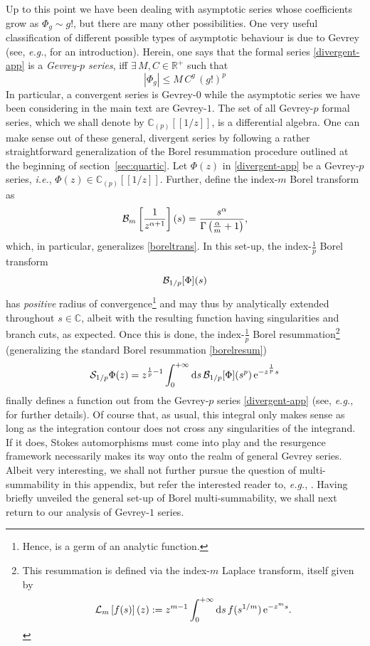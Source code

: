 \documentclass[11pt,a4paper]{article}
\newcommand{\CB}{{\cal B}}
\newcommand{\CL}{{\cal L}}
\newcommand{\CS}{{\cal S}}
\def\BR{{\mathbb R}}
\def\BC{{\mathbb C}}
\newcommand{\be}{\begin{equation}}
\newcommand{\ee}{\end{equation}}
\newcommand{\rme}{{\mathrm{e}}}
\newcommand{\rmd}{{\mathrm{d}}}
\begin{document}
Up to this point we have been dealing with asymptotic series whose coefficients grow as $\Phi_g \sim g!$, but there are many other possibilities. One very useful classification of different possible types of asymptotic behaviour is due to Gevrey (see, \textit{e.g.}, \cite{j14} for an introduction). Herein, one says that the formal series \eqref{divergent-app} is a \textit{Gevrey-$p$ series}, iff $\exists\, M,C \in \BR^+$ such that
%
\be
| \Phi_g | \le M\, C^g\, \left( g! \right)^p
\ee
%
\noindent
In particular, a convergent series is Gevrey-$0$ while the asymptotic series we have been considering in the main text are Gevrey-$1$. The set of all Gevrey-$p$ formal series, which we shall denote by $\BC_{(p)} [[1/z]]$, is a differential algebra. One can make sense out of these general, divergent series by following a rather straightforward generalization of the Borel resummation procedure outlined at the beginning of section~\ref{sec:quartic}. Let $\Phi (z)$ in \eqref{divergent-app} be a Gevrey-$p$ series, \textit{i.e.}, $\Phi (z) \in \BC_{(p)} [[1/z]]$. Further, define the index-$m$ Borel transform as
%
\be
\CB_m \left[ \frac{1}{z^{\alpha+1}} \right](s) = \frac{s^{\alpha}}{\Gamma \left( \frac{\alpha}{m}+1 \right)},
\ee
%
\noindent
which, in particular, generalizes \eqref{boreltrans}. In this set-up, the index-$\frac{1}{p}$ Borel transform
%
\be
\CB_{1/p} [ \Phi ](s)
\ee
%
\noindent
has \textit{positive} radius of convergence\footnote{Hence, is a germ of an analytic function.} and may thus by analytically extended throughout $s \in \BC$, albeit with the resulting function having singularities and branch cuts, as expected. Once this is done, the index-$\frac{1}{p}$ Borel resummation\footnote{This resummation is defined via the index-$m$ Laplace transform, itself given by
%
\be
\CL_m \left[ f(s) \right] (z) := z^{m-1} \int_0^{+\infty} \rmd s\, f ( s^{1/m} )\, \rme^{- z^m s}.
\ee} (generalizing the standard Borel resummation \eqref{borelresum})
%
\be
\label{borel-resum-app}
\CS_{1/p} \Phi (z) = z^{\frac{1}{p}-1} \int_0^{+\infty} \rmd s\, \CB_{1/p} [\Phi](s^{p})\, \rme^{- z^{\frac{1}{p}} s}
\ee
%
\noindent
finally defines a function out from the Gevrey-$p$ series \eqref{divergent-app} (see, \textit{e.g.}, \cite{j14} for further details). Of course that, as usual, this integral only makes sense as long as the integration contour does not cross any singularities of the integrand. If it does, Stokes automorphisms must come into play and the resurgence framework necessarily makes its way onto the realm of general Gevrey series. Albeit very interesting, we shall not further pursue the question of multi-summability in this appendix, but refer the interested reader to, \textit{e.g.}, \cite{lr16}. Having briefly unveiled the general set-up of Borel multi-summability, we shall next return to our analysis of Gevrey-$1$ series.
\end{document}
